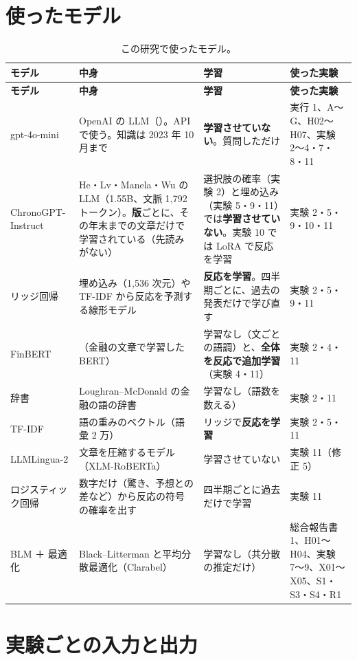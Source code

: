 \section{使ったモデル}

\begin{longtable}{P{2.9cm}P{4.0cm}P{4.0cm}P{3.6cm}}
\caption{この研究で使ったモデル。}\label{tab:io-models}\\
\toprule
\textbf{モデル} & \textbf{中身} & \textbf{学習} & \textbf{使った実験} \\
\midrule
\endfirsthead
\toprule
\textbf{モデル} & \textbf{中身} & \textbf{学習} & \textbf{使った実験} \\
\midrule
\endhead
\bottomrule
\endfoot
gpt-4o-mini & OpenAI の LLM（）。API で使う。知識は 2023 年 10 月まで & \textbf{学習させていない}。質問しただけ & 実行 1、A〜G、H02〜H07、実験 2〜4・7・8・11 \\
ChronoGPT-Instruct & He・Lv・Manela・Wu の LLM（1.55B、文脈 1,792 トークン）。\textbf{版}ごとに、その年末までの文章だけで学習されている（先読みがない） & 選択肢の確率（実験 2）と埋め込み（実験 5・9・11）では\textbf{学習させていない}。実験 10 では LoRA で反応を学習 & 実験 2・5・9・10・11 \\
リッジ回帰 & 埋め込み（1,536 次元）や TF-IDF から反応を予測する線形モデル & \textbf{反応を学習}。四半期ごとに、過去の発表だけで学び直す & 実験 2・5・9・11 \\
FinBERT & （金融の文章で学習した BERT） & 学習なし（文ごとの語調）と、\textbf{全体を反応で追加学習}（実験 4・11） & 実験 2・4・11 \\
辞書 & Loughran--McDonald の金融の語の辞書 & 学習なし（語数を数える） & 実験 2・11 \\
TF-IDF & 語の重みのベクトル（語彙 2 万） & リッジで\textbf{反応を学習} & 実験 2・5・11 \\
LLMLingua-2 & 文章を圧縮するモデル（XLM-RoBERTa） & 学習させていない & 実験 11（修正 5） \\
ロジスティック回帰 & 数字だけ（驚き、予想との差など）から反応の符号の確率を出す & 四半期ごとに過去だけで学習 & 実験 11 \\
BLM ＋ 最適化 & Black--Litterman と平均分散最適化（Clarabel） & 学習なし（共分散の推定だけ） & 総合報告書 1、H01〜H04、実験 7〜9、X01〜X05、S1・S3・S4・R1 \\
\end{longtable}

\section{実験ごとの入力と出力}

